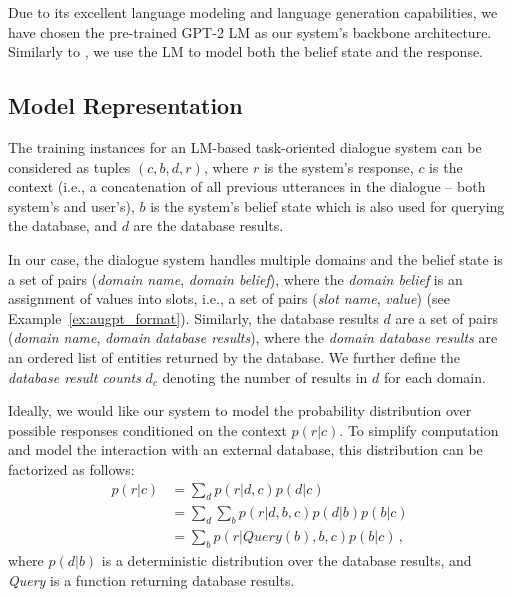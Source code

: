 \documentclass[letterpaper]{article} %
\newcommand{\exampleref}[1]{Example~\ref{#1}}
\newcommand{\exampleref}[1]{Figure~\ref{#1}}
\begin{document}
Due to its excellent language modeling and language generation capabilities, we have chosen the pre-trained GPT-2 LM as our system's backbone architecture. Similarly to \citet{budzianowski2019}, we use the LM to model both the belief state and the response.

\subsection{Model Representation}

The training instances for an LM-based task-oriented dialogue system can be considered as tuples $(c, b, d, r)$, where $r$ is the system's response, $c$ is the context (i.e., a concatenation of all previous utterances in the dialogue – both system's and user's), $b$ is the system's belief state which is also used for querying the database, and $d$ are the database results. 

In our case, the dialogue system handles multiple domains and the belief state is a set of pairs (\emph{domain name}, \emph{domain belief}), where the \emph{domain belief} is an assignment of values into slots, i.e., a set of pairs (\textit{slot name}, \textit{value}) (see \exampleref{ex:augpt_format}). Similarly, the database results $d$ are a set of pairs (\textit{domain name}, \textit{domain database results}), where the \textit{domain database results} are an ordered list of entities returned by the database. We further define the \emph{database result counts} $d_c$ denoting the number of results in $d$ for each domain.

Ideally, we would like our system to model the probability distribution over possible responses conditioned on the context $p(r|c)$. To simplify computation and model the interaction with an external database, this distribution can be factorized as follows:
\begin{equation}
\begin{split}
    p(r|c) &= \sum_{d} p(r|d,c) p(d|c) \\
           &= \sum_{d} \sum_{b} p(r|d,b,c) p(d|b) p(b|c) \\
           &= \sum_{b} p(r|\textit{Query}(b),b,c) p(b|c)\,,
\end{split}
\end{equation}
where $p(d|b)$ is a deterministic distribution over the database results, and \textit{Query} is a function returning database results.
\end{document}
